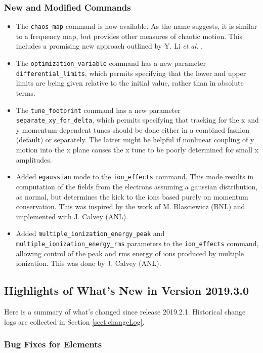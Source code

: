 \documentclass[11pt]{article}
\begin{document}
\subsubsection{New and Modified Commands}
\begin{itemize}
\item The \verb|chaos_map| command is now available. As the name suggests, it is similar to
  a frequency map, but provides other measures of chaotic motion. This includes a promising new
  approach outlined by Y. Li {\em et al.} \cite{Li-arxiv-1912.00121}.
\item The \verb|optimization_variable| command has a new parameter \verb|differential_limits|, which 
  permits specifying that the lower and upper limits are being given relative to the initial value,
  rather than in absolute terms.
\item The \verb|tune_footprint| command has a new parameter \verb|separate_xy_for_delta|, which permits
  specifying that tracking for the x and y momentum-dependent tunes should be done either in a combined 
  fashion (default) or separately. The latter might be helpful if nonlinear coupling of y motion into the x plane
  causes the x tune to be poorly determined for small x amplitudes.
\item Added \verb|egaussian| mode to the \verb|ion_effects| command. This mode results in computation of the fields
  from the electrons assuming a gaussian distribution, as normal, but determines the kick to the ions based purely on
  momentum conservation. This was inspired by the work of M. Blasciewicz (BNL) and implemented with J. Calvey (ANL).
\item Added \verb|multiple_ionization_energy_peak| and \verb|multiple_ionization_energy_rms| parameters to 
  the \verb|ion_effects| command, allowing control of the peak and rms energy of ions produced by multiple ionization.
  This was done by J. Calvey (ANL).
\end{itemize}

\subsection{Highlights of What's New in Version 2019.3.0}

Here is a summary of what's changed since release 2019.2.1.
Historical change logs are collected in Section \ref{sect:changeLog}.

\subsubsection{Bug Fixes for Elements}
\end{document}

